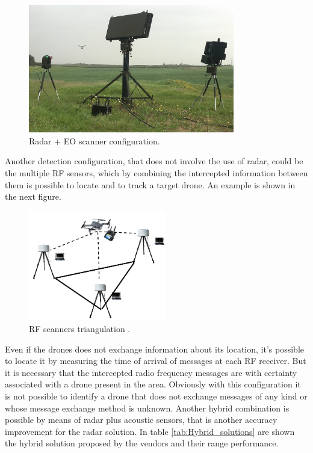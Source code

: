 \begin{figure}[h!]
    \centering
    \includegraphics[width=9cm]{imgs/radar + eo camera.jpg}
    \caption{Radar + EO scanner configuration.}
    \label{EOcamera}
\end{figure}

Another detection configuration, that does not involve the use of radar, could be the multiple RF sensors, which by combining the intercepted information between them is possible to locate and to track a target drone. An example is shown in the next figure.

\begin{figure}[h!]
    \centering
    \includegraphics[width=6cm]{imgs/RF scanner triangulation.png}
    \caption{RF scanners triangulation \cite{survey}.}
\end{figure}
\newpage

Even if the drones does not exchange information about its location, it's possible to locate it by measuring the time of arrival of messages at each RF receiver. But it is necessary that the intercepted radio frequency messages are with certainty associated with a drone present in the area. Obviously with this configuration it is not possible to identify a drone that does not exchange messages of any kind or whose message exchange method is unknown. Another hybrid combination is possible by means of radar plus acoustic sensors, that is another accuracy improvement for the radar solution. In table \ref{tab:Hybrid_solutions} are shown the hybrid solution proposed by the vendors and their range performance.
\\


